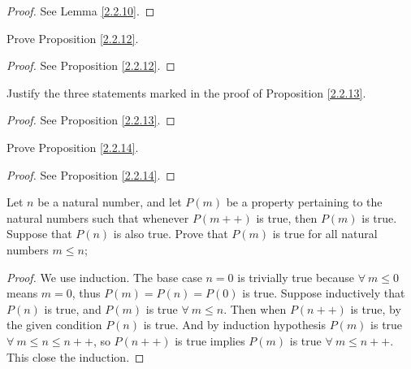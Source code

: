 \begin{proof}
See Lemma \ref{2.2.10}.
\end{proof}

\begin{exercise}\label{ex 2.2.3}
Prove Proposition \ref{2.2.12}.
\end{exercise}

\begin{proof}
See Proposition \ref{2.2.12}.
\end{proof}

\begin{exercise}\label{ex 2.2.4}
Justify the three statements marked in the proof of Proposition \ref{2.2.13}.
\end{exercise}

\begin{proof}
See Proposition \ref{2.2.13}.
\end{proof}

\begin{exercise}\label{ex 2.2.5}
Prove Proposition \ref{2.2.14}.
\end{exercise}

\begin{proof}
See Proposition \ref{2.2.14}.
\end{proof}

\begin{exercise}\label{ex 2.2.6}
Let \(n\) be a natural number, and let \(P(m)\) be a property pertaining to the natural numbers such that whenever \(P(m++)\) is true, then \(P(m)\) is true.
Suppose that \(P(n)\) is also true.
Prove that \(P(m)\) is true for all natural numbers \(m \leq n\);
\end{exercise}

\begin{proof}
We use induction.
The base case \(n = 0\) is trivially true because \(\forall\ m \leq 0\) means \(m = 0\), thus \(P(m) = P(n) = P(0)\) is true.
Suppose inductively that \(P(n)\) is true, and \(P(m)\) is true \(\forall\ m \leq n\).
Then when \(P(n++)\) is true, by the given condition \(P(n)\) is true.
And by induction hypothesis \(P(m)\) is true \(\forall\ m \leq n \leq n++\), so \(P(n++)\) is true implies \(P(m)\) is true \(\forall\ m \leq n++\).
This close the induction.
\end{proof}
